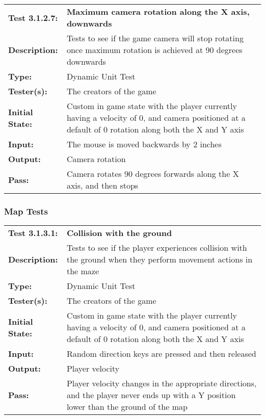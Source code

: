 \documentclass[12pt, titlepage]{article}
\begin{document}
\begin{mdframed}[linewidth=1pt]
\begin{tabularx}{\textwidth}{@{}p{3cm}X@{}}
{\bf Test 3.1.2.7:} & {\bf Maximum camera rotation along the X axis, downwards}\\[\baselineskip]
{\bf Description:} & Tests to see if the game camera will stop rotating once maximum rotation is achieved at 90 degrees downwards\\[0.5\baselineskip]
{\bf Type:} & Dynamic Unit Test\\[0.5\baselineskip]
{\bf Tester(s):} & The creators of the game\\[0.5\baselineskip]
{\bf Initial State:} & Custom in game state with the player currently having a velocity of 0, and camera positioned at a default of 0 rotation along both the X and Y axis\\[0.5\baselineskip]
{\bf Input:} & The mouse is moved backwards by 2 inches\\[0.5\baselineskip]
{\bf Output:} & Camera rotation\\[0.5\baselineskip]
{\bf Pass:} & Camera rotates 90 degrees forwards along the X axis, and then stops
\end{tabularx}
\end{mdframed}

\subsubsection{Map Tests}
\begin{mdframed}[linewidth=1pt]
\begin{tabularx}{\textwidth}{@{}p{3cm}X@{}}
{\bf Test 3.1.3.1:} & {\bf Collision with the ground}\\[\baselineskip]
{\bf Description:} & Tests to see if the player experiences collision with the ground when they perform movement actions in the maze\\[0.5\baselineskip]
{\bf Type:} & Dynamic Unit Test\\[0.5\baselineskip]
{\bf Tester(s):} & The creators of the game\\[0.5\baselineskip]
{\bf Initial State:} & Custom in game state with the player currently having a velocity of 0, and camera positioned at a default of 0 rotation along both the X and Y axis\\[0.5\baselineskip]
{\bf Input:} & Random direction keys are pressed and then released \\[0.5\baselineskip]
{\bf Output:} & Player velocity\\[0.5\baselineskip]
{\bf Pass:} & Player velocity changes in the appropriate directions, and the player never ends up with a Y position lower than the ground of the map
\end{tabularx}
\end{mdframed}
\end{document}
